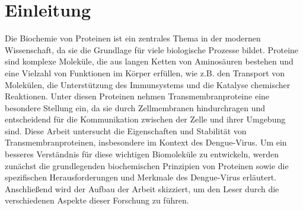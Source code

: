 \documentclass[german,version-2022-01]{uzl-thesis}
\begin{document}
%
%


\chapter{Einleitung}


%
Die Biochemie von Proteinen ist ein zentrales Thema in der modernen Wissenschaft, da sie die Grundlage f\"ur viele biologische Prozesse bildet. Proteine sind komplexe Molek\"ule, die aus langen Ketten von Aminos\"auren bestehen und eine Vielzahl von Funktionen im K\"orper erf\"ullen, wie z.B. den Transport von Molek\"ulen, die Unterst\"utzung des Immunsystems und die Katalyse chemischer Reaktionen. Unter diesen Proteinen nehmen Transmembranproteine eine besondere Stellung ein, da sie durch Zellmembranen hindurchragen und entscheidend f\"ur die Kommunikation zwischen der Zelle und ihrer Umgebung sind. Diese Arbeit untersucht die Eigenschaften und Stabilit\"at von Transmembranproteinen, insbesondere im Kontext des Dengue-Virus. Um ein besseres Verst\"andnis f\"ur diese wichtigen Biomolek\"ule zu entwickeln, werden zun\"achst die grundlegenden biochemischen Prinzipien von Proteinen sowie die spezifischen Herausforderungen und Merkmale des Dengue-Virus erl\"autert. Anschlie\ss{}end wird der Aufbau der Arbeit skizziert, um den Leser durch die verschiedenen Aspekte dieser Forschung zu f\"uhren.
\end{document}
